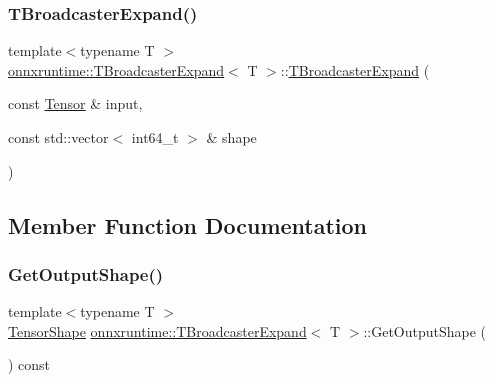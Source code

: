 \subsubsection{\texorpdfstring{T\+Broadcaster\+Expand()}{TBroadcasterExpand()}}
{\footnotesize\ttfamily template$<$typename T $>$ \\
\mbox{\hyperlink{structonnxruntime_1_1TBroadcasterExpand}{onnxruntime\+::\+T\+Broadcaster\+Expand}}$<$ T $>$\+::\mbox{\hyperlink{structonnxruntime_1_1TBroadcasterExpand}{T\+Broadcaster\+Expand}} (\begin{DoxyParamCaption}\item[{const \mbox{\hyperlink{classonnxruntime_1_1Tensor}{Tensor}} \&}]{input,  }\item[{const std\+::vector$<$ int64\+\_\+t $>$ \&}]{shape }\end{DoxyParamCaption})\hspace{0.3cm}{\ttfamily [inline]}}



\subsection{Member Function Documentation}
\mbox{\label{structonnxruntime_1_1TBroadcasterExpand_a67d4843aedc9e85848c2c875b728e649}} 
\subsubsection{\texorpdfstring{Get\+Output\+Shape()}{GetOutputShape()}}
{\footnotesize\ttfamily template$<$typename T $>$ \\
\mbox{\hyperlink{classonnxruntime_1_1TensorShape}{Tensor\+Shape}} \mbox{\hyperlink{structonnxruntime_1_1TBroadcasterExpand}{onnxruntime\+::\+T\+Broadcaster\+Expand}}$<$ T $>$\+::Get\+Output\+Shape (\begin{DoxyParamCaption}{ }\end{DoxyParamCaption}) const\hspace{0.3cm}{\ttfamily [inline]}}

\mbox{\label{structonnxruntime_1_1TBroadcasterExpand_af97cb7082da7e26d1741748983d34b83}} 
